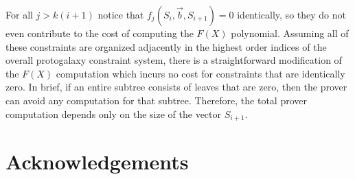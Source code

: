 \documentclass[11pt]{article} %
\begin{document}
For all $j > k (i+1)$ notice that $f_j(S_i, \vec{b}, S_{i+1}) = 0$ identically, so they do not even contribute to the cost of computing the $F(X)$ polynomial.
Assuming all of these constraints are organized adjacently in the highest order indices of the overall protogalaxy constraint system, there is a straightforward modification of the $F(X)$ computation which incurs no cost for constraints that are identically zero.
In brief, if an entire subtree consists of leaves that are zero, then the prover can avoid any computation for that subtree.
Therefore, the total prover computation depends only on the size of the vector $S_{i+1}$.



\section*{Acknowledgements}


\end{document}
